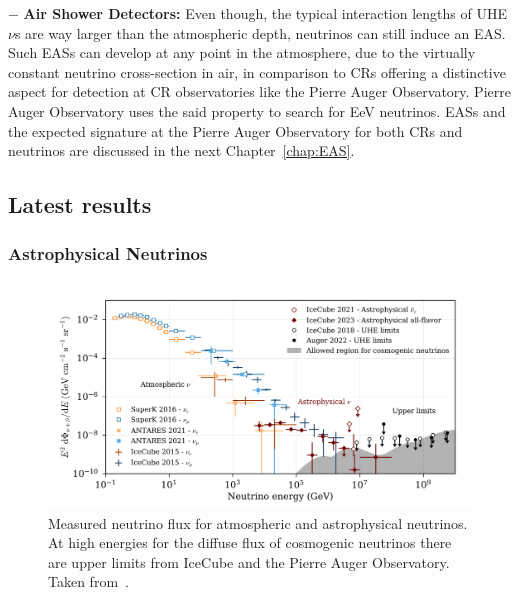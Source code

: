 \begin{description}
  \item $-$ \textbf{Air Shower Detectors:} Even though, the typical interaction lengths of UHE$\nu$s are way larger than the atmospheric depth, neutrinos can still induce an EAS. Such EASs can develop at any point in the atmosphere, due to the virtually constant neutrino cross-section in air, in comparison to \glspl{CR} offering a distinctive aspect for detection at \gls{CR} observatories like the Pierre Auger Observatory. Pierre Auger Observatory uses the said property to search for EeV neutrinos. EASs and the expected signature at the Pierre Auger Observatory for both \glspl{CR} and neutrinos are discussed in the next Chapter~\ref{chap:EAS}.   

  \end{description}

\subsection{Latest results}
  \label{subsec:Nuresults}
  
\subsubsection*{Astrophysical Neutrinos}

\begin{figure}[t!]
  \centering
  \includegraphics[width=14.5cm]{thesis_figures/CRnNu/Nu_flux_measurement.png}
  \caption{Measured neutrino flux for atmospheric and astrophysical neutrinos. At high energies for the diffuse flux of cosmogenic neutrinos there are upper limits from IceCube and the Pierre Auger Observatory. Taken from~\cite{ParticleDataGroup:2024cfk}.}
  \label{fig:Nu_flux_measurement}
\end{figure}

